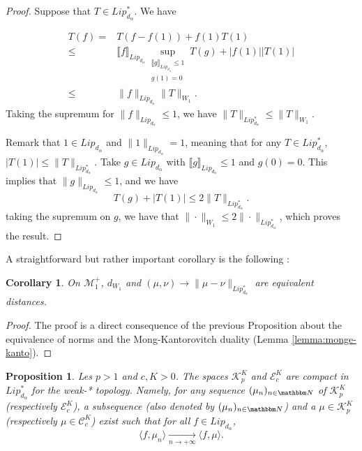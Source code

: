 \documentclass[a4paper,11pt, reqno]{amsart}
\newcommand{\cC}{\mathcal{C}}	\newcommand{\CC}{\mathbbm{C}}
\newcommand{\cE}{\mathcal{E}}	\newcommand{\EE}{\mathbbm{E}}
\newcommand{\cK}{\mathcal{K}}	\newcommand{\KK}{\mathbbm{K}}
\newcommand{\cM}{\mathcal{M}}	\newcommand{\MM}{\mathbbm{M}}
\newcommand{\1}{\mathbbm{1}}
\theoremstyle{plain}
\newtheorem{corollary}[theorem]{Corollary}
\newtheorem{proposition}[theorem]{Proposition}
\theoremstyle{definition}
\begin{document}
\begin{proof}
Suppose that $T \in Lip_{d_\alpha}^*$. We have 

\begin{align*}
T(f) = & T(f-f(1))+f(1)T(1) \\
\le & \llbracket f \rrbracket_{Lip_{d_\alpha}} \sup_{\substack{\llbracket g\rrbracket_{Lip_{d_\alpha}} \le 1 \\ g(1) = 0}} T(g)  + |f(1)| |T(1)| \\
\le & \|f\|_{Lip_{d_{\alpha}}} \|T\|_{W_1}.
\end{align*}
Taking the supremum for $\|f\|_{Lip_{d_{\alpha}}} \le 1$, we have 
$\|T\|_{Lip^*_{d_\alpha}} \le  \|T\|_{W_1}$.

Remark that $1\in Lip_{d_\alpha}$ and $\|1\|_{Lip_{d_\alpha}} = 1$, meaning that for any $T\in Lip_{d_\alpha}^*$,
$|T(1)| \le \|T\|_{Lip^*_{d_\alpha}}$.
Take $g\in Lip_{d_\alpha}$ with $\llbracket g\rrbracket_{Lip_{d_\alpha}} \le 1$ and $g(0) = 0$. This implies that $\|g\|_{Lip_{d_\alpha}} \le 1$, and we have
\[T(g) + |T(1)| \le 2\|T\|_{Lip^*_{d_\alpha}}.\]
taking the supremum on $g$, we have that $\|\cdot\|_{W_1}\le 2\|\cdot\|_{Lip^*_{d_\alpha}}$, which proves the result. 
\end{proof}

A straightforward but rather important corollary is the following :
\begin{corollary}
    On $\cM^+_1$, $d_{W_1}$ and $(\mu,\nu)\to\|\mu-\nu\|_{Lip_{d_\alpha}^*}$ are equivalent distances.      
\end{corollary}

\begin{proof}
    The proof is a direct consequence of the previous Proposition about the equivalence of norms and the Mong-Kantorovitch duality (Lemma \ref{lemma:monge-kanto}).
\end{proof}

\begin{proposition}
    Les $p>1$ and $c,K >0$. The spaces $\cK^K_p$ and $\cE^{K}_c$ are compact in  $Lip^*_{d_\alpha}$ for the weak-* topology. Namely, for any sequence $(\mu_n)_{n\in \NN}$ of $\cK^K_p$ (respectively $\cE^K_c$), a subsequence (also denoted by $(\mu_n)_{n\in \NN}$) and a $\mu \in \cK^K_p$ (respectively $\mu \in \cC^{K}_c$) exist such that for all $f\in Lip_{d_\alpha}$, 
    \[\langle f,\mu_n \rangle \underset{n\to + \infty}{\longrightarrow} \langle f, \mu \rangle.\]
\end{proposition}
\end{document}
